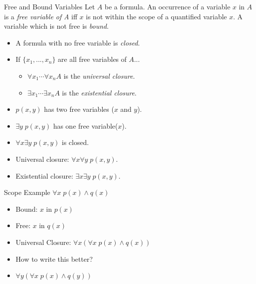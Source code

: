 \documentclass[style=sailor,size=12pt,mode=present]{powerdot}
\theoremstyle{definition}
\newenvironment{defn}[1]
  {\renewcommand\theinnerdefn{#1}\innerdefn}
  {\endinnerdefn}
\newenvironment{ex}[1]
  {\renewcommand\theinnerexample{#1}\innerexample}
  {\endinnerexample}
\begin{document}
\begin{wideslide}[bm=,toc=]{Free and Bound Variables}
\begin{defn}{7.12}
Let $A$ be a formula. An occurrence of a variable $x$ in $A$ is
a \emph{free variable of A} iff $x$ is not within the scope of
a quantified variable $x$. A variable which is not free is \emph{bound}.
\end{defn}
\vspace*{-2ex}
\begin{itemize}
\item A formula with no free variable is \emph{closed}.
\item If $\{x_1,...,x_n\}$ are all free variables of $A$...
  \begin{itemize}
      \item $\forall x_1 \cdots \forall x_n A$ is the \emph{universal closure}.
      \item $\exists x_1 \cdots \exists x_n A$ is the \emph{existential closure}.
  \end{itemize}
\end{itemize}
\vspace*{-2ex}
\begin{ex}{7.13}
\end{ex}
\vspace*{-2ex}
\begin{itemize}
\item $p(x,y)$ has two free variables ($x$ and $y$).
\item $\exists y\; p(x,y)$ has one free variable($x$).
\item $\forall x \exists y \;p(x,y)$ is closed.
\item Universal closure: $\forall x \forall y \;p(x,y)$.
\item Existential closure: $\exists x \exists y \;p(x,y)$.
\end{itemize}
\end{wideslide}
\begin{wideslide}[bm=,toc=]{Scope Example}
\begin{ex}{7.14}
$\forall x \; p(x) \land q(x)$
\end{ex}
\vspace*{-2ex}
\begin{itemize}
\item<2-> Bound: \pause[2] $x$ in $p(x)$
\item<4-> Free: \pause[2] $x$ in $q(x)$
\item<6-> Universal Closure: \pause[2] $\forall x(\forall x \; p(x) \land q(x))$
\item<8-> How to write this better?
\item<9-> $\forall y(\forall x \; p(x) \land q(y))$
\end{itemize}
\end{wideslide}
\end{document}

